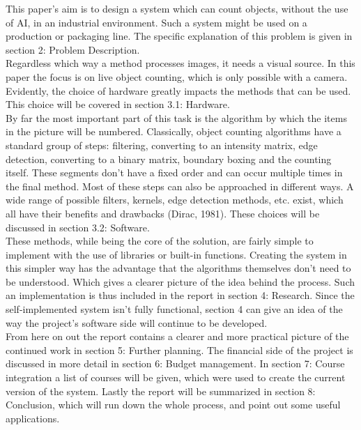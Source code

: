 \documentclass{article}
\begin{document}
This paper's aim is to design a system which can count objects, without the use of AI, in an industrial environment. Such a system might be used on a production or packaging line. The specific explanation of this problem is given in section 2: Problem Description.\\
Regardless which way a method processes images, it needs a visual source. In this paper the focus is on live object counting, which is only possible with a camera. Evidently, the choice of hardware greatly impacts the methods that can be used. This choice will be covered in section 3.1: Hardware.\\
By far the most important part of this task is the algorithm by which the items in the picture will be numbered. Classically, object counting algorithms have a standard group of steps: filtering, converting to an intensity matrix, edge detection, converting to a binary matrix, boundary boxing and the counting itself. These segments don't have a fixed order and can occur multiple times in the final method. Most of these steps can also be approached in different ways. A wide range of possible filters, kernels, edge detection methods, etc. exist, which all have their benefits and drawbacks (Dirac, 1981). These choices will be discussed in section 3.2: Software.\\
These methods, while being the core of the solution, are fairly simple to implement with the use of libraries or built-in functions. Creating the system in this simpler way has the advantage that the algorithms themselves don't need to be understood. Which gives a clearer picture of the idea behind the process. Such an implementation is thus included in the report in section 4: Research. Since the self-implemented system isn't fully functional, section 4 can give an idea of the way the project's software side will continue to be developed.\\
From here on out the report contains a clearer and more practical picture of the continued work in section 5: Further planning. The financial side of the project is discussed in more detail in section 6: Budget management. In section 7: Course integration a list of courses will be given, which were used to create the current version of the system. Lastly the report will be summarized in section 8: Conclusion, which will run down the whole process, and point out some useful applications.
\end{document}
